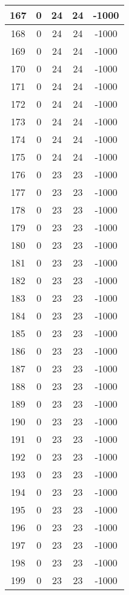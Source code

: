 \documentclass[letterpaper, 12pt]{article}
\begin{document}
\begin{longtable}{|c|c|c|c|c|}
\hline
167 & 0 & 24 & 24 & -1000 \\
\hline
168 & 0 & 24 & 24 & -1000 \\
\hline
169 & 0 & 24 & 24 & -1000 \\
\hline
170 & 0 & 24 & 24 & -1000 \\
\hline
171 & 0 & 24 & 24 & -1000 \\
\hline
172 & 0 & 24 & 24 & -1000 \\
\hline
173 & 0 & 24 & 24 & -1000 \\
\hline
174 & 0 & 24 & 24 & -1000 \\
\hline
175 & 0 & 24 & 24 & -1000 \\
\hline
176 & 0 & 23 & 23 & -1000 \\
\hline
177 & 0 & 23 & 23 & -1000 \\
\hline
178 & 0 & 23 & 23 & -1000 \\
\hline
179 & 0 & 23 & 23 & -1000 \\
\hline
180 & 0 & 23 & 23 & -1000 \\
\hline
181 & 0 & 23 & 23 & -1000 \\
\hline
182 & 0 & 23 & 23 & -1000 \\
\hline
183 & 0 & 23 & 23 & -1000 \\
\hline
184 & 0 & 23 & 23 & -1000 \\
\hline
185 & 0 & 23 & 23 & -1000 \\
\hline
186 & 0 & 23 & 23 & -1000 \\
\hline
187 & 0 & 23 & 23 & -1000 \\
\hline
188 & 0 & 23 & 23 & -1000 \\
\hline
189 & 0 & 23 & 23 & -1000 \\
\hline
190 & 0 & 23 & 23 & -1000 \\
\hline
191 & 0 & 23 & 23 & -1000 \\
\hline
192 & 0 & 23 & 23 & -1000 \\
\hline
193 & 0 & 23 & 23 & -1000 \\
\hline
194 & 0 & 23 & 23 & -1000 \\
\hline
195 & 0 & 23 & 23 & -1000 \\
\hline
196 & 0 & 23 & 23 & -1000 \\
\hline
197 & 0 & 23 & 23 & -1000 \\
\hline
198 & 0 & 23 & 23 & -1000 \\
\hline
199 & 0 & 23 & 23 & -1000 \\
\hline
\end{longtable}
\end{document}
